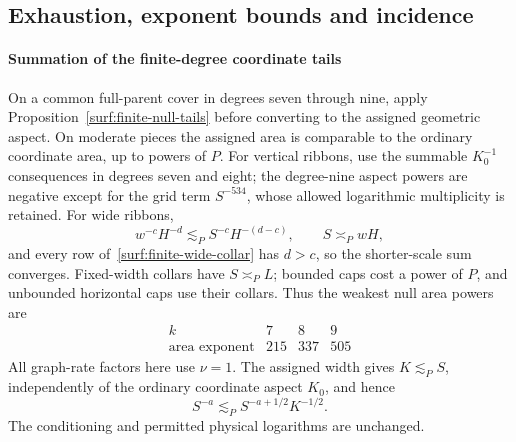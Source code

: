 \documentclass[11pt]{amsart}
\theoremstyle{definition}
\theoremstyle{remark}
\numberwithin{equation}{section}
\begin{document}
\subsection{Exhaustion, exponent bounds and incidence}\label{surf:finite-completion}\label{low:78:s78:exhaustion}\label{low:78:s78:closing}\label{low:9:root9:completion}

\paragraph{Summation of the finite-degree coordinate tails}\label{surf:finite-tail-summation}
On a common full-parent cover in degrees seven through nine, apply Proposition~\ref{surf:finite-null-tails} before converting to the assigned geometric aspect. On moderate pieces the assigned area is comparable to the ordinary coordinate area, up to powers of $P$. For vertical ribbons, use the summable $K_0^{-1}$ consequences in degrees seven and eight; the degree-nine aspect powers are negative except for the grid term $S^{-534}$, whose allowed logarithmic multiplicity is retained. For wide ribbons,
\[
w^{-c}H^{-d}\lesssim_PS^{-c}H^{-(d-c)},\qquad S\asymp_PwH,
\]
and every row of~\eqref{surf:finite-wide-collar} has $d>c$, so the shorter-scale sum converges. Fixed-width collars have $S\asymp_PL$; bounded caps cost a power of $P$, and unbounded horizontal caps use their collars. Thus the weakest null area powers are
\[
\begin{array}{c|ccc}
k&7&8&9\\\hline
\text{area exponent}&215&337&505
\end{array}
\]
All graph-rate factors here use $\nu=1$. The assigned width gives $K\lesssim_PS$, independently of the ordinary coordinate aspect $K_0$, and hence
\begin{equation}\label{surf:finite-aspect-conversion}
S^{-a}\lesssim_PS^{-a+1/2}K^{-1/2}.
\end{equation}
The conditioning and permitted physical logarithms are unchanged.
\end{document}
